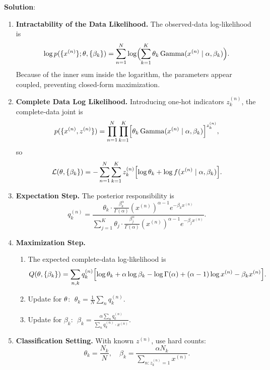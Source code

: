 \documentclass[submit]{../harvardml}
\newenvironment{solution}{
    \vspace{2mm}
    \color{blue}\noindent\textbf{Solution}:
}{}
\begin{document}
\begin{solution}
\begin{enumerate}
\item \textbf{Intractability of the Data Likelihood.} The observed‐data log‐likelihood is
\[
\log p(\{x^{(n)}\};\mathbf{\theta},\{\beta_k\})
=\sum_{n=1}^N\log\Bigl(\sum_{k=1}^K\theta_k\,\mathrm{Gamma}(x^{(n)}\mid\alpha,\beta_k)\Bigr).
\]
Because of the inner sum inside the logarithm, the parameters appear coupled, preventing closed-form maximization.

\item \textbf{Complete Data Log Likelihood.} Introducing one‐hot indicators $z^{(n)}_k$, the complete‐data joint is
\[
p(\{x^{(n)},z^{(n)}\})
=\prod_{n=1}^N\prod_{k=1}^K\Bigl[\theta_k\,\mathrm{Gamma}(x^{(n)}\mid\alpha,\beta_k)\Bigr]^{z^{(n)}_k},
\]
so
\[
\mathcal{L}(\mathbf{\theta},\{\beta_k\})
=-\sum_{n=1}^N\sum_{k=1}^K z^{(n)}_k\Bigl[\log\theta_k
+\log f(x^{(n)}\mid\alpha,\beta_k)\Bigr].
\]

\item \textbf{Expectation Step.} The posterior responsibility is
\[
q^{(n)}_k
=\frac{\theta_k \cdot \frac{\beta_k^\alpha}{\Gamma(\alpha)}(x^{(n)})^{\alpha-1}e^{-\beta_k x^{(n)}}}
{\sum_{j=1}^K \theta_j \cdot \frac{\beta_j^\alpha}{\Gamma(\alpha)}(x^{(n)})^{\alpha-1}e^{-\beta_j x^{(n)}}}.
\]

\item \textbf{Maximization Step.}
\begin{enumerate}
  \item The expected complete‐data log‐likelihood is
  \[
  Q(\mathbf{\theta},\{\beta_k\})
  =\sum_{n,k}q^{(n)}_k\Bigl[\log\theta_k+\alpha\log\beta_k-\log\Gamma(\alpha)+(\alpha-1)\log x^{(n)}-\beta_k x^{(n)}\Bigr].
  \]
  \item Update for $\mathbf{\theta}$: $\;\theta_k=\frac{1}{N}\sum_n q^{(n)}_k.$
  \item Update for $\beta_k$: $\;\beta_k=\frac{\alpha \sum_n q^{(n)}_k}{\sum_n q^{(n)}_k \cdot x^{(n)}}.$
\end{enumerate}

\item \textbf{Classification Setting.} With known $z^{(n)}$, use hard counts:
\[
\theta_k=\frac{N_k}{N},
\quad
\beta_k=\frac{\alpha N_k}{\sum_{n:z^{(n)}_k=1}x^{(n)}}.
\]
\end{enumerate}
\end{solution}

\newpage
\end{document}
